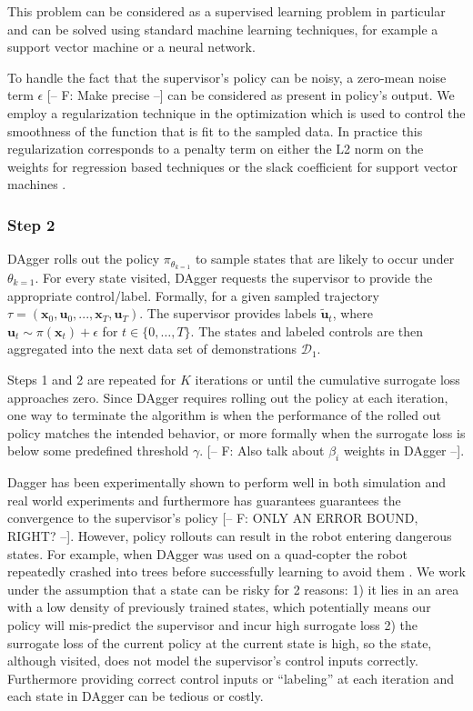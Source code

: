 \documentclass[10pt, conference]{ieeeconf}      %
\newcommand{\bu}{\mathbf{u}}
\newcommand{\bx}{\mathbf{x}}
\begin{document}
This problem can be considered as a supervised learning problem in particular and can be solved using standard machine
learning techniques, for example a support vector machine or a neural network. 
 
To handle the fact that the supervisor's policy can be noisy, a zero-mean noise term $\epsilon$ 
{ \color{blue} [-- F: Make precise --]}
can be considered as present in policy's output. We employ a regularization technique in the optimization which is
used to control the smoothness of the function that is fit to the sampled data. In practice this regularization corresponds to a penalty term on either the L2 norm on the weights for regression based techniques or the slack coefficient for support vector machines \cite{scholkopf2002learning}.
 
 \subsubsection{Step 2}
DAgger rolls out the policy $\pi_{\theta_{k=1}}$ to sample states that are likely to occur under $\theta_{k=1}$. For every state visited, DAgger requests the supervisor to provide the appropriate control/label. Formally, for a given sampled trajectory  $\tau = (\bx_0,\bu_0,...,\bx_T,\bu_T )$. The supervisor provides labels $\tilde{\bu}_t$, where $\bu_t \sim \pi(\bx_t) + \epsilon$ for $t\in \{0, \ldots, T\}$.
The states and labeled controls are then aggregated into the next data set of demonstrations $\mathcal{D}_1$. 

Steps 1 and 2 are repeated for $K$ iterations or until the cumulative surrogate loss approaches zero. Since DAgger
requires rolling out the policy at each iteration, one way to terminate the algorithm is when the performance of the
rolled out policy matches the intended behavior, or more formally when the surrogate loss is below some predefined
threshold $\gamma$. {\color{blue} [-- F: Also talk about $\beta_i$ weights in DAgger --]}. 

Dagger has been experimentally shown to perform  well in both simulation and real world experiments and furthermore
has guarantees guarantees the convergence to the supervisor's policy {\color{blue} [-- F: ONLY AN ERROR BOUND, RIGHT? --]}. 
However, policy rollouts can result in the robot entering dangerous states. For example, when DAgger was used on a
quad-copter the robot repeatedly crashed into trees before successfully learning to avoid them \cite{ross2013learning}.
We work under the assumption that a state can be risky for 2 reasons: 1) it lies in an area with a low density of
previously trained states, which potentially means our policy will mis-predict the supervisor and incur high surrogate
loss \cite{tokdar2010importance} 2) the surrogate loss of the current policy at the current state is high, so the state, although visited, does
not model the supervisor's control inputs correctly. Furthermore providing correct control inputs or ``labeling'' at each
iteration and each state in DAgger can be tedious or costly.
\end{document}
